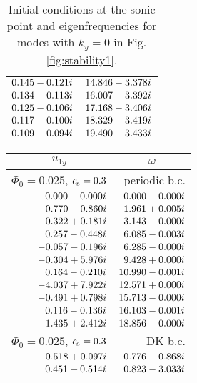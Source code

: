 \documentclass[useAMS,usenatbib]{mn2e}
\begin{document}
\begin {table}
\begin{center}
\begin{tabular}{r r}
    $0.145  	- 	0.121i$ 	&  	$14.846  	- 	3.378i$ \\
    $0.134  	- 	0.113i$ 	&  	$16.007  	- 	3.392i$ \\
    $0.125  	- 	0.106i$ 	&  	$17.168  	- 	3.406i$ \\
    $0.117  		- 	0.100i$ 	&  	$18.329  	- 	3.419i$ \\
    $0.109  	- 	0.094i$ 	&  	$19.490  	- 	3.433i$ \\
    \hline
    \end{tabular}
\caption{Initial conditions at the sonic point and eigenfrequencies for modes with $k_y=0$ in Fig. \ref{fig:stability1}. \label{tab:1}}
\end{center}
\end{table}


\begin {table}
\begin{center}
    \begin{tabular}{r r}
   \multicolumn{1}{c}{\Large $u_{1y}$} & \multicolumn{1}{c}{\Large $\omega$} \\[1mm]
    \hline
    $\Phi_0 =0.025$, $c_{\rm s}=0.3$ &  periodic b.c. \\
    \hline
    $0.000  	+ 	0.000i$ 	&  $0.000  	- 	0.000i$ \\
    $-0.770 	- 	0.860i$ 	&  $1.961  	+ 	0.005i$ \\
    $-0.322 	+ 	0.181i$ 	&  $3.143  	- 	0.000i$ \\
    $0.257  	- 	0.448i$ 	&  $6.085  	- 	0.003i$ \\
    $-0.057  	- 	0.196i$ 	&  $6.285  	- 	0.000i$ \\
    $-0.304  	+ 	5.976i$ 	&  $9.428  	+ 	0.000i$ \\
    $0.164  	- 	0.210i$ 	&  $10.990  	- 	0.001i$ \\
    $-4.037  	+ 	7.922i$ 	&  $12.571  	+ 	0.000i$ \\
    $-0.491  	+ 	0.798i$ 	&  $15.713  	- 	0.000i$ \\
    $0.116 		- 	0.136i$ 	&  $16.103  	- 	0.001i$ \\
    $-1.435  	+ 	2.412i$ 	&  $18.856  	- 	0.000i$ \\
    \hline
    $\Phi_0 =0.025$, $c_{\rm s}=0.3$ &  DK b.c. \\
    \hline
    $-0.518 + 0.097i$	&  $0.776  - 0.868i$ \\
    $0.451  + 0.514i$ 	&  $0.823  - 3.033i$ \\

\end{tabular}
\end{center}
\end{table}
\end{document}
